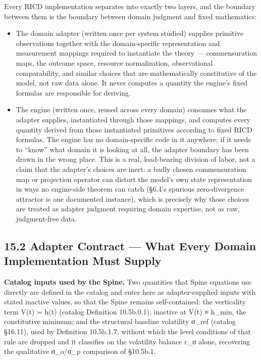\documentclass[
]{article}
\begin{document}
Every RICD implementation separates into exactly two layers, and the
boundary between them is the boundary between domain judgment and fixed
mathematics:

\begin{itemize}
\item
  The domain adapter (written once per system studied) supplies
  primitive observations together with the domain-specific
  representation and measurement mappings required to instantiate the
  theory --- commensuration maps, the outcome space, resource
  normalization, observational comparability, and similar choices that
  are mathematically constitutive of the model, not raw data alone. It
  never computes a quantity the engine's fixed formulas are responsible
  for deriving.
\item
  The engine (written once, reused across every domain) consumes what
  the adapter supplies, instantiated through those mappings, and
  computes every quantity derived from those instantiated primitives
  according to fixed RICD formulas. The engine has no domain-specific
  code in it anywhere; if it needs to ``know'' what domain it is looking
  at all, the adapter boundary has been drawn in the wrong place. This
  is a real, load-bearing division of labor, not a claim that the
  adapter's choices are inert: a badly chosen commensuration map or
  projection operator can distort the model's own state representation
  in ways no engine-side theorem can catch (§6.4's spurious
  zero-divergence attractor is one documented instance), which is
  precisely why those choices are treated as adapter judgment requiring
  domain expertise, not as raw, judgment-free data.
\end{itemize}

\hypertarget{adapter-contract-what-every-domain-implementation-must-supply}{%
\subsection{15.2 Adapter Contract --- What Every Domain Implementation
Must
Supply}\label{adapter-contract-what-every-domain-implementation-must-supply}}

\textbf{Catalog inputs used by the Spine.} Two quantities that Spine
equations use directly are defined in the catalog and enter here as
adapter-supplied inputs with stated inactive values, so that the Spine
remains self-contained: the verticality term V(t) = h(t) (catalog
Definition 10.5b.0.1), inactive at V(t) ≡ h\_min, the constitutive
minimum; and the structural baseline volatility σ\_ref (catalog §16.11),
used by Definition 10.5b.1.7, without which the level conditions of that
rule are dropped and it classifies on the volatility balance r\_σ alone,
recovering the qualitative σ\_o/σ\_p comparison of §10.5b.1.
\end{document}
